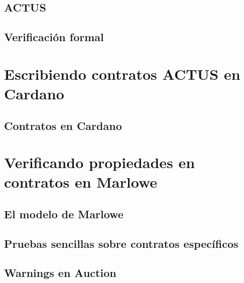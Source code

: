 \documentclass{beamer}
\begin{document}
\begin{frame}

\end{frame}

\subsection{ACTUS}

\begin{frame}

\end{frame}

\subsection{Verificación formal}

\begin{frame}

\end{frame}

\section{Escribiendo contratos ACTUS en Cardano}

\subsection{Contratos en Cardano}

\begin{frame}

\end{frame}

\section{Verificando propiedades en contratos en Marlowe}

\subsection{El modelo de Marlowe}

\subsection{Pruebas sencillas sobre contratos específicos}

\subsection{Warnings en Auction}
\end{document}
